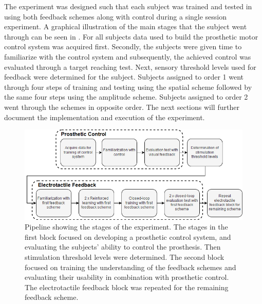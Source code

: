 The experiment was designed such that each subject was trained and tested in using both feedback schemes along with control during a single session experiment. A graphical illustration of the main stages that the subject went through can be seen in . For all subjects data used to build the prosthetic motor control system was acquired first. Secondly, the subjects were given time to familiarize with the control system and subsequently, the achieved control was evaluated through a target reaching test. Next, sensory threshold levels used for feedback were determined for the subject. Subjects assigned to order 1 went through four steps of training and testing using the spatial scheme followed by the same four steps using the amplitude scheme. Subjects assigned to order 2 went through the schemes in opposite order. The next sections will further document the implementation and execution of the experiment.     

\begin{figure}[H]                 
	\includegraphics[width=.95\textwidth]{figures/std_paper}
	\caption{Pipeline showing the stages of the experiment. The stages in the first block focused on developing a prosthetic control system, and evaluating the subjects' ability to control the prosthesis. Then stimulation threshold levels were determined. The second block focused on training the understanding of the feedback schemes and evaluating their usability in combination with prosthetic control. The electrotactile feedback block was repeated for the remaining feedback scheme.}
	\label{fig:std} 
\end{figure}